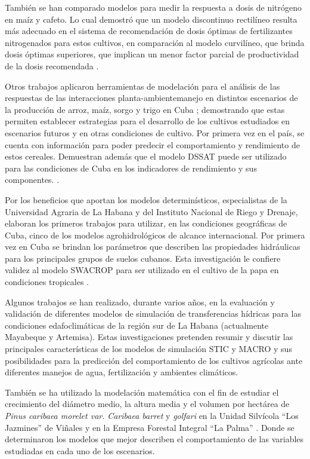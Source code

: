 También se han comparado modelos para medir la respuesta a dosis de nitrógeno en maíz y cafeto. Lo cual demostró que un modelo discontinuo rectilíneo resulta más adecuado en el sistema de recomendación de dosis óptimas de fertilizantes nitrogenados para estos cultivos, en comparación al modelo curvilíneo, que brinda dosis óptimas superiores, que implican un menor factor parcial de productividad de la dosis recomendada \parencite{martin2016comparacion, rodriguez2018aplicaciones}.

Otros trabajos aplicaron herramientas de modelación para el análisis de las respuestas de las interacciones planta-ambientemanejo en distintos escenarios de la producción de arroz, maíz, sorgo y trigo en Cuba \parencite{hernandez2016utilizacion}; demostrando que estas permiten establecer estrategias para el desarrollo de los cultivos estudiados en escenarios futuros y en otras condiciones de cultivo. Por primera vez en el país, se cuenta con información para poder predecir el comportamiento y rendimiento de estos cereales. Demuestran además que el modelo DSSAT puede ser utilizado para las condiciones de Cuba en los indicadores de rendimiento y sus componentes. \parencite{rodriguez2018aplicaciones}.

Por los beneficios que aportan los modelos determinísticos, especialistas de la Universidad Agraria de La Habana y del Instituto Nacional de Riego y Drenaje, elaboran los primeros trabajos para utilizar, en las condiciones geográficas de Cuba, cinco de los modelos agrohidrológicos de alcance internacional. Por primera vez en Cuba se brindan los parámetros que describen las propiedades hidráulicas para los principales grupos de suelos cubanos. Esta investigación le confiere validez al modelo SWACROP para ser utilizado en el cultivo de la papa en condiciones tropicales \parencite{ruiz1997utilizacion, rodriguez2018aplicaciones}.

Algunos trabajos se han realizado, durante varios años, en la evaluación y validación de diferentes modelos de simulación de transferencias hídricas para las condiciones edafoclimáticas de la región sur de La Habana (actualmente Mayabeque y Artemisa). Estas investigaciones pretenden resumir y discutir las principales características de los modelos de simulación STIC y MACRO y sus posibilidades para la predicción del comportamiento de los cultivos agrícolas ante diferentes manejos de agua, fertilización y ambientes climáticos. \parencite{lopez20143, robaina2013crop, rodriguez2018aplicaciones}

También se ha utilizado la modelación matemática con el fin de estudiar el crecimiento del diámetro medio, la altura media y el volumen por hectárea de \textit{Pinus caribaea morelet var.}
\textit{Caribaea barret} y \textit{golfari }en la Unidad Silvícola “Los Jazmines” de Viñales y en la Empresa Forestal Integral “La Palma” \parencite{suarez2011modelacion, sarria2013modelacion}. Donde se determinaron los modelos que mejor describen el comportamiento de las variables estudiadas en cada uno de los escenarios. \parencite{rodriguez2018aplicaciones}


